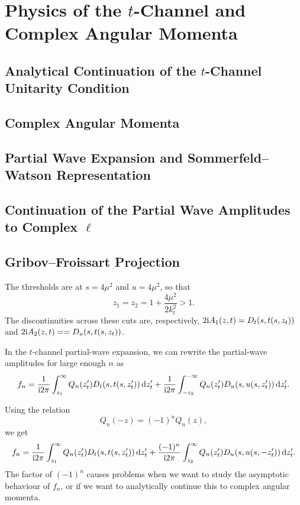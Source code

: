 \chapter{Physics of the \texorpdfstring{$t$}{t}-Channel and Complex Angular Momenta}

\section{Analytical Continuation of the \texorpdfstring{$t$}{t}-Channel Unitarity Condition}
\section{Complex Angular Momenta}
\section{Partial Wave Expansion and Sommerfeld--Watson Representation}
\section{Continuation of the Partial Wave Amplitudes to Complex \texorpdfstring{$\ell$}{l}}
\section{Gribov--Froissart Projection}

\M
The thresholds are at $s=4\mu^{2}$ and $u=4\mu^{2}$, so that
\begin{equation}
z_{1} = z_{2} = 1 + \frac{4\mu^{2}}{2k_{t}^{2}} > 1.
\end{equation}
The discontinuities across these cuts are, respectively, $2\mathrm{i}A_{1}(z,t)=D_{t}(s,t(s,z_{t}))$
and $2\mathrm{i}A_{2}(z,t) = =D_{u}(s,t(s,z_{t}))$.

\M
In the $t$-channel partial-wave expansion,
we can rewrite the partial-wave amplitudes for large enough $n$ as
\begin{equation}
f_{n} = \frac{1}{\mathrm{i}2\pi}\int^{\infty}_{z_{1}}Q_{n}(z_{t}')D_{t}(s,t(s,z_{t}'))\,\mathrm{d} z_{t}'
+ \frac{1}{\mathrm{i}2\pi}\int^{-\infty}_{-z_{2}}Q_{n}(z_{t}')D_{u}(s,u(s,z_{t}'))\,\mathrm{d} z_{t}'.
\end{equation}

\M
Using the relation
\begin{equation}
Q_{n}(-z)=(-1)^{n}Q_{n}(z),
\end{equation}
we get
\begin{equation}
f_{n} = \frac{1}{\mathrm{i}2\pi}\int^{\infty}_{z_{1}}Q_{n}(z_{t}')D_{t}(s,t(s,z_{t}'))\,\mathrm{d} z_{t}'
+ \frac{(-1)^{n}}{\mathrm{i}2\pi}\int^{\infty}_{z_{2}}Q_{n}(z_{t}')D_{u}(s,u(s,-z_{t}'))\,\mathrm{d} z_{t}'.
\end{equation}
The factor of $(-1)^{n}$ causes problems when we want to study the
asymptotic behaviour of $f_{n}$, or if we want to analytically continue
this to complex angular momenta.

